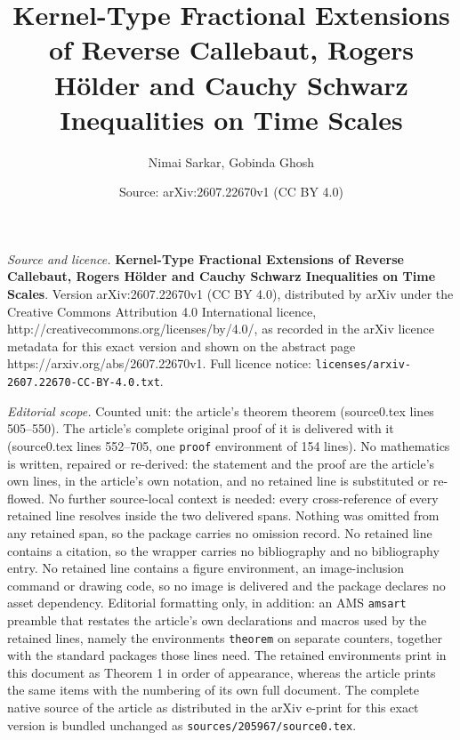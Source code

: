 \documentclass[10pt,a4paper]{amsart}
\title{\textbf{Kernel-Type Fractional Extensions of Reverse Callebaut, Rogers H\"older and Cauchy Schwarz Inequalities on Time Scales}}
\author{Nimai Sarkar, Gobinda Ghosh}
\date{Source: arXiv:2607.22670v1 (CC BY 4.0)}
\begin{document}
\maketitle

\noindent\emph{Source and licence.} \textbf{Kernel-Type Fractional Extensions of Reverse Callebaut, Rogers H\"older and Cauchy Schwarz Inequalities on Time Scales}. Version arXiv:2607.22670v1 (CC BY 4.0), distributed by arXiv under the Creative Commons Attribution 4.0 International licence, http://creativecommons.org/licenses/by/4.0/, as recorded in the arXiv licence metadata for this exact version and shown on the abstract page https://arxiv.org/abs/2607.22670v1. Full licence notice: \texttt{licenses/arxiv-2607.22670-CC-BY-4.0.txt}.\par\smallskip

\noindent\textit{Editorial scope.} Counted unit: the article's theorem theorem (source0.tex lines 505--550). The article's complete original proof of it is delivered with it (source0.tex lines 552--705, one \texttt{proof} environment of 154 lines). No mathematics is written, repaired or re-derived: the statement and the proof are the article's own lines, in the article's own notation, and no retained line is substituted or re-flowed.  No further source-local context is needed: every cross-reference of every retained line resolves inside the two delivered spans.  Nothing was omitted from any retained span, so the package carries no omission record.  No retained line contains a citation, so the wrapper carries no bibliography and no bibliography entry.  No retained line contains a figure environment, an image-inclusion command or drawing code, so no image is delivered and the package declares no asset dependency.  Editorial formatting only, in addition: an AMS \texttt{amsart} preamble that restates the article's own declarations and macros used by the retained lines, namely the environments \texttt{theorem} on separate counters, together with the standard packages those lines need.  The retained environments print in this document as Theorem 1 in order of appearance, whereas the article prints the same items with the numbering of its own full document.  The complete native source of the article as distributed in the arXiv e-print for this exact version is bundled unchanged as \texttt{sources/205967/source0.tex}.
\end{document}
